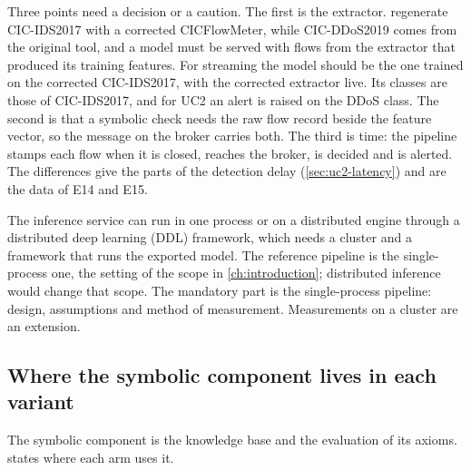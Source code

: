 Three points need a decision or a caution. The first is the extractor.
 regenerate CIC-IDS2017 with a corrected CICFlowMeter,
while CIC-DDoS2019 comes from the original tool, and a model must be served with flows
from the extractor that produced its training features. For streaming the model should
be the one trained on the corrected CIC-IDS2017, with the corrected extractor live. Its
classes are those of CIC-IDS2017, and for UC2 an alert is raised on the DDoS class.
The second is that a symbolic check needs the raw flow record beside the feature
vector, so the message on the broker carries both. The third is time: the pipeline
stamps each flow when it is closed, reaches the broker, is decided and is alerted.
The differences give the parts of the detection delay (\cref{sec:uc2-latency}) and
are the data of E14 and E15.

The inference service can run in one process or on a distributed engine through a
distributed deep learning (DDL) framework, which needs a cluster and a framework that
runs the exported model. The reference pipeline is the single-process one, the setting
of the scope in \cref{ch:introduction}; distributed inference would change that scope.
The mandatory part is the single-process pipeline: design, assumptions and method
of measurement. Measurements on a cluster are an extension.

\subsection{Where the symbolic component lives in each variant}
\label{sec:symbolic-placement}

The symbolic component is the knowledge base and the evaluation of its axioms.
 states where each arm uses it.

